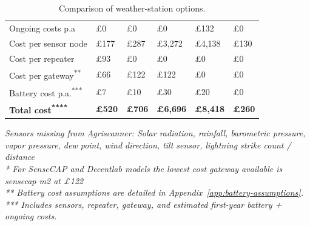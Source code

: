 \begin{table}[H]
\begin{tabularx}{\textwidth}{l >{\raggedright\arraybackslash}X
      >{\raggedright\arraybackslash}X >{\raggedright\arraybackslash}X
      >{\raggedright\arraybackslash}X >{\raggedright\arraybackslash}X}
    Ongoing costs p.a                               & \pounds{}0 & \pounds{}0 &
                                                    \pounds{}0 & \pounds{}132 &
                                                    \pounds{}0 \\
    Cost per sensor node                            & \pounds{}177 &
    \pounds{}287                                    & \pounds{}3{,}272 &
    \pounds{}4{,}138                                & \pounds{}130 \\
    Cost per repeater                               & \pounds{}93 & \pounds{}0 &
                                                    \pounds{}0 & \pounds{}0 &
                                                    \pounds{}0 \\
    Cost per gateway\textsuperscript{**}            & \pounds{}66 & \pounds{}122
                                                    & \pounds{}122 & \pounds{}0
                                                    & \pounds{}0 \\
    Battery cost p.a.\textsuperscript{***}          & \pounds{}7 & \pounds{}10 &
                                                    \pounds{}30 & \pounds{}20 &
                                                    \pounds{}0 \\
    \textbf{Total cost\textsuperscript{****}}       & \textbf{\pounds{}520} &
    \textbf{\pounds{}706}                           & \textbf{\pounds{}6{,}696}
    & \textbf{\pounds{}8{,}418} & \textbf{\pounds{}260} \\
    \hline
  \end{tabularx}

  \vspace{0.25em}
  \textit{\footnotesize * Sensors missing from Agriscanner: Solar radiation,
    rainfall, barometric pressure, vapor pressure, dew point, wind direction,
    tilt sensor, lightning strike count / distance} \\
  \textit{\footnotesize ** For SenseCAP and Decentlab models the lowest cost
    gateway available is sensecap m2 at £122} \\
  \textit{\footnotesize *** Battery cost assumptions are detailed in
    Appendix~\ref{app:battery-assumptions}.} \\
  \textit{\footnotesize **** Includes sensors, repeater, gateway, and estimated first-year battery + ongoing costs.}
  \caption{Comparison of weather-station options.}
  \label{tab:commercial-comparison}
\end{table}

